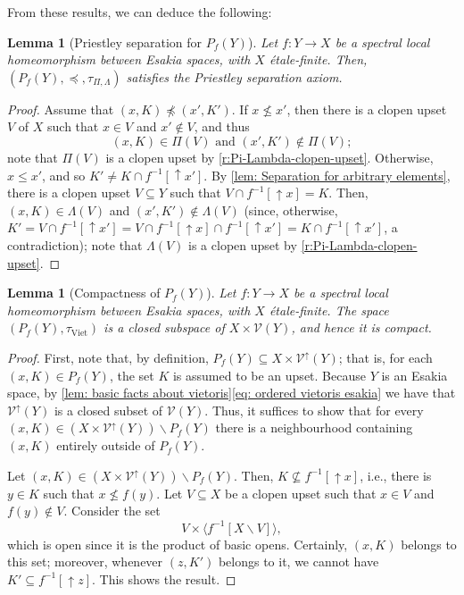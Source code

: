\documentclass[12pt]{amsart}
\theoremstyle{plain}
\newtheorem{lemma}[theorem]{Lemma}
\theoremstyle{definition}
\newcommand{\V}{\mathcal{V}}
\newcommand{\Vu}{\V^{\uparrow}}
\newcommand{\Viet}{\mathrm{Viet}}
\renewcommand{\u}{{\uparrow}}
\begin{document}
From these results, we can deduce the following:

\begin{lemma}[Priestley separation for $P_f(Y)$] \label{lem: Priestley holds for P_f basic topology} 
    Let $f \colon Y \to X$ be a spectral local homeomorphism between Esakia spaces, with $X$ étale-finite.  Then, $(P_{f}(Y), \preceq, \tau_{\Pi, \Lambda})$ satisfies the Priestley separation axiom.
\end{lemma}
\begin{proof}
    Assume that $(x,K)\npreceq (x',K')$. 
    If $x \nleq x'$, then there is a clopen upset $V$ of $X$ such that $x\in V$ and $x'\notin V$, and thus
    \[
        (x, K) \in \Pi(V) \text{ and } (x',K')\notin \Pi(V);
    \]
    note that $\Pi(V)$ is a clopen upset by \cref{r:Pi-Lambda-clopen-upset}.
    Otherwise, $x\leq x'$, and so $K' \neq K \cap f^{-1}[{\u}x']$.
    By \cref{lem: Separation for arbitrary elements}, there is a clopen upset $V\subseteq Y$ such that $V \cap f^{-1}[{\u}x] = K$.
    Then, $(x, K) \in \Lambda(V)$ and $(x', K') \notin \Lambda(V)$ (since, otherwise, $K' = V \cap f^{-1}[{\u}x'] = V\cap f^{-1}[{\u}x] \cap f^{-1}[{\u}x'] = K \cap f^{-1}[{\u}x']$, a contradiction); 
    note that $\Lambda(V)$ is a clopen upset by \cref{r:Pi-Lambda-clopen-upset}.
\end{proof}


\begin{lemma}[Compactness of $P_f(Y)$] \label{lem: power object closed subspace}
     Let $f \colon Y \to X$ be a spectral local homeomorphism between Esakia spaces, with $X$ étale-finite.
     The space $(P_{f}(Y),\tau_{\Viet})$ is a closed subspace of $X\times \V(Y)$, and hence it is compact.
\end{lemma}

\begin{proof}
    First, note that, by definition, $P_{f}(Y)\subseteq X\times\Vu(Y)$; that is, for each $(x,K) \in P_f(Y)$, the set $K$ is assumed to be an upset. Because $Y$ is an Esakia space, by \cref{lem: basic facts about vietoris}\eqref{eq: ordered vietoris esakia} we have that $\Vu(Y)$ is a closed subset of $\V(Y)$.
    Thus, it suffices to show that for every $(x, K)\in (X \times \Vu(Y)) \smallsetminus P_f(Y)$ there is a neighbourhood containing $(x, K)$ entirely outside of $P_{f}(Y)$.
    
    Let $(x,K)\in (X \times \Vu(Y)) \smallsetminus P_f(Y)$.
    Then, $K\nsubseteq f^{-1}[{\u}x]$, i.e., there is $y\in K$ such that $x\nleq f(y)$. Let $V\subseteq X$ be a clopen upset such that $x\in V$ and $f(y)\notin V$. Consider the set
    \[
        V\times \langle f^{-1}[X \smallsetminus V]\rangle,
    \]
    which is open since it is the product of basic opens.    
    Certainly, $(x,K)$ belongs to this set; moreover, whenever $(z,K')$ belongs to it, we cannot have $K'\subseteq f^{-1}[{\u}z]$. 
    This shows the result.
\end{proof}
\end{document}
